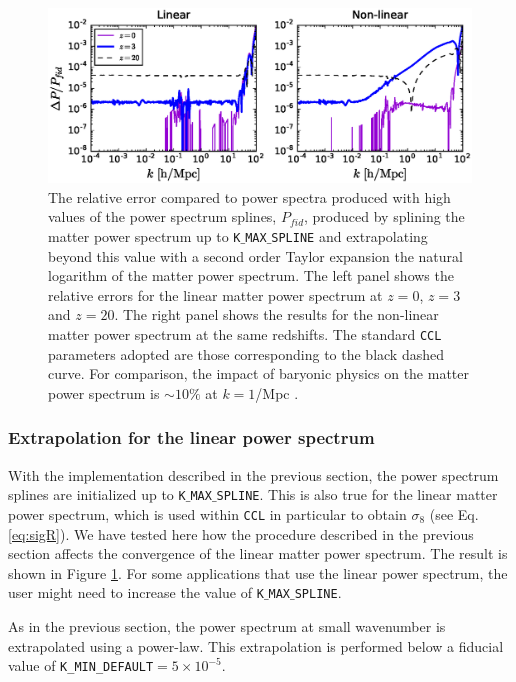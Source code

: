\documentclass[\docopts]{\docclass}
\newcommand{\ccl}{{\tt CCL}\xspace}
\begin{document}
\begin{figure}
\centering
\includegraphics[width=1.0\textwidth]{plot_power.eps}
\caption{The relative error compared to power spectra produced with high values of the power spectrum splines, $P_{fid}$, produced by splining the matter power spectrum up to {\tt K$\_$MAX$\_$SPLINE} and extrapolating beyond this value with a second order Taylor expansion the natural logarithm of the matter power spectrum. The left panel shows the relative errors for the linear matter power spectrum at $z=0$, $z=3$ and $z=20$. The right panel shows the results for the non-linear matter power spectrum at the same redshifts. The standard \ccl parameters adopted are those corresponding to the black dashed curve. For comparison, the impact of baryonic physics on the matter power spectrum is $\sim 10\%$ at $k=1$/Mpc \citep{Schneider15}.}
\label{fig:NLextrapol}
\end{figure}

\subsubsection{Extrapolation for the linear power spectrum}
\label{sec:Lextrapol}

With the implementation described in the previous section, the power spectrum splines are initialized up to {\tt K$\_$MAX$\_$SPLINE}. This is also true for the linear matter power spectrum, which is used within \ccl in particular to obtain $\sigma_8$ (see Eq. \ref{eq:sigR}). We have tested here how the procedure described in the previous section affects the convergence of the linear matter power spectrum. The result is shown in Figure \ref{fig:NLextrapol}. For some applications that use the linear power spectrum, the user might need to increase the value of {\tt K$\_$MAX$\_$SPLINE}.

As in the previous section, the power spectrum at small wavenumber is extrapolated using a power-law. This extrapolation is performed below a fiducial value of {\tt K\_MIN\_DEFAULT}$=5\times 10^{-5}$.
\end{document}
